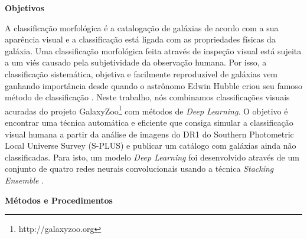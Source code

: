 \documentclass[10pt, a4paper, twocolumn]{article}
\begin{document}


\begin{center}
  \bf\fontsize{13}{15.6}\selectfont Objetivos
\end{center}

A classificação morfológica é a catalogação de galáxias de acordo com a sua aparência visual e a classificação está ligada com as propriedades físicas da galáxia. Uma classificação morfológica feita através de inspeção visual está sujeita a um viés causado pela subjetividade da observação humana. Por isso, a classificação sistemática, objetiva e facilmente reproduzível de galáxias vem ganhando importância desde quando o astrônomo Edwin Hubble criou seu famoso método de classificação \cite{hubble1926}. Neste trabalho, nós combinamos classificações visuais acuradas do projeto GalaxyZoo\footnote{http://galaxyzoo.org} com métodos de \emph{Deep Learning}. O objetivo é encontrar uma técnica automática e eficiente que consiga simular a classificação visual humana a partir da análise de imagens do DR1 do Southern Photometric Local Universe Survey (S-PLUS) \cite{oliveira2019} e publicar um catálogo com galáxias ainda não classificadas. Para isto, um modelo \emph{Deep Learning} foi desenvolvido através de um conjunto de quatro redes neurais convolucionais usando a técnica \emph{Stacking Ensemble} \cite{Wolpert1992}.

\begin{center}
  \bf\fontsize{13}{15.6}\selectfont Métodos e Procedimentos
\end{center}
\end{document}
